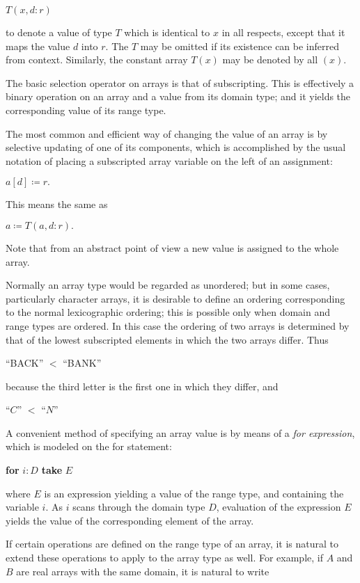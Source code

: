 \quad $T(x, d:r)$

\noindent
to denote a value of type $T$ which is identical to $x$ in all respects, except that it maps the value $d$ into $r$. The $T$ may be omitted if its existence can be inferred from context. Similarly, the constant array $T(x)$ may be denoted by all $(x)$.

The basic selection operator on arrays is that of subscripting. This is effectively a binary operation on an array and a value from its domain type; and it yields the corresponding value of its range type.

The most common and efficient way of changing the value of an array is by selective updating of one of its components, which is accomplished by the usual notation of placing a subscripted array variable on the left of an assignment:

\quad $a[d]\coloneq r.$

\noindent
This means the same as

\quad $a\coloneq T(a, d:r).$

\noindent
Note that from an abstract point of view a new value is assigned to the whole array.

Normally an array type would be regarded as unordered; but in some cases, particularly character arrays, it is desirable to define an ordering corresponding to the normal lexicographic ordering; this is possible only when domain and range types are ordered. In this case the ordering of two arrays is determined by that of the lowest subscripted elements in which the two arrays differ. Thus

\quad ``BACK'' $<$ ``BANK''

\noindent
because the third letter is the first one in which they differ, and

\quad ``$C$'' $<$ ``$N$''

A convenient method of specifying an array value is by means of a \textit{for expression}, which is modeled on the for statement:

\quad \textbf{for} $i:D$ \textbf{take} $E$

\noindent
where $E$ is an expression yielding a value of the range type, and containing the variable $i$. As $i$ scans through the domain type $D$, evaluation of the expression $E$ yields the value of the corresponding element of the array.

If certain operations are defined on the range type of an array, it is natural to extend these operations to apply to the array type as well. For example, if $A$ and $B$ are real arrays with the same domain, it is natural to write

